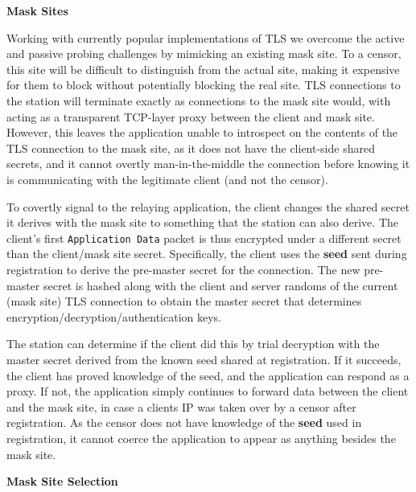 \documentclass[sigconf]{acmart}
\renewcommand{\paragraph}[1]{\smallskip\noindent\textbf{#1\quad}}
\begin{document}
\paragraph{Mask Sites}
\label{sec:mask-sites}

Working with currently popular implementations of TLS we overcome the active 
and passive probing challenges by mimicking an existing mask site. To a censor, this site
will be difficult to distinguish from the actual site, making it expensive for
them to block without potentially blocking the real site. TLS connections to the
\scheme station will terminate exactly as connections to the mask site would, with
\scheme acting as a transparent TCP-layer proxy between the client and mask site.
However, this leaves the application unable to introspect on the contents of the
TLS connection to the mask site, as it does not have the client-side shared
secrets, and it cannot overtly man-in-the-middle the connection before knowing
it is communicating with the legitimate client (and not the censor).


To covertly signal to the relaying application, the client changes the shared secret
it derives with the mask site to something that the \scheme station can also derive. The client's first
\texttt{Application Data} packet is thus encrypted under a different secret than
the client/mask site secret. Specifically, the client uses the \textbf{seed}
sent during registration to derive the pre-master secret for the connection.
The new pre-master secret is hashed along with the client and server randoms of the current
(mask site) TLS connection to obtain the master secret that determines
encryption/decryption/authentication keys.

The \scheme station can determine if the client did this by trial decryption with
the master secret derived from the known seed shared at registration. If it succeeds, the
client has proved knowledge of the seed, and the application can
respond as a proxy. If not, the application simply continues to forward data
between the client and the mask site, in case a clients IP was taken over by
a censor after registration. As the censor does not have knowledge of
the \textbf{seed} used in registration, it cannot coerce the application to
appear as anything besides the mask site.


\paragraph{Mask Site Selection}
\end{document}

